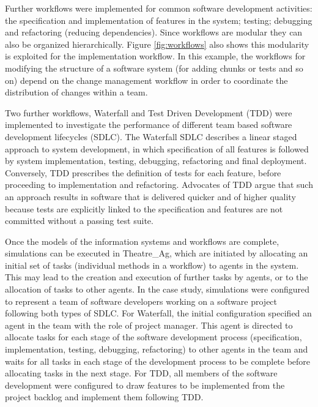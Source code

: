 \documentclass{llncs}
\begin{document}
Further workflows were implemented for common software development activities: the specification and implementation of
features in the system; testing; debugging and refactoring (reducing dependencies).  Since workflows are modular they
can also be organized hierarchically.  Figure \ref{fig:workflows} also shows this modularity is exploited for the
implementation workflow. In this example, the workflows for modifying the structure of a software system (for adding
chunks or tests and so on) depend on the change management workflow in order to coordinate the distribution of changes
within a team.

Two further workflows, Waterfall and Test Driven Development (TDD) were implemented to investigate the performance of
different team based software development lifecycles (SDLC).  The Waterfall SDLC \citep{benington83production} describes
a linear staged approach to system development, in which specification of all features is followed by system
implementation, testing, debugging, refactoring and final deployment.  Conversely, TDD \citep{beck02test} prescribes the
definition of tests for each feature, before proceeding to implementation and refactoring.  Advocates of TDD argue that
such an approach results in software that is delivered quicker and of higher quality because tests are explicitly linked
to the specification and features are not committed without a passing test suite.

Once the models of the information systems and workflows are complete, simulations can be executed in Theatre\_Ag, which
are initiated by allocating an initial set of tasks (individual methods in a workflow) to agents in the system. This may
lead to the creation and execution of further tasks by agents, or to the allocation of tasks to other agents.  In the
case study, simulations were configured to represent a team of software developers working on a software project
following both types of SDLC.  For Waterfall, the initial configuration specified an agent in the team with the role of
project manager.  This agent is directed to allocate tasks for each stage of the software development process
(specification, implementation, testing, debugging, refactoring) to other agents in the team and waits for all tasks in
each stage of the development process to be complete before allocating tasks in the next stage.  For TDD, all members of
the software development were configured to draw features to be implemented from the project backlog and implement them
following TDD.
\end{document}

